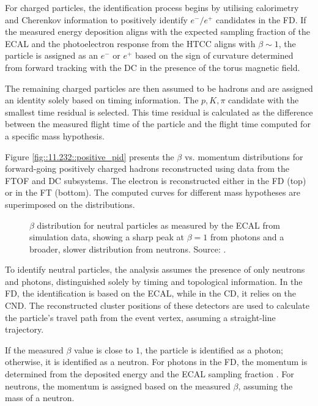     For charged particles, the identification process begins by utilising calorimetry and Cherenkov information to positively identify $e^-/e^+$ candidates in the FD.
    If the measured energy deposition aligns with the expected sampling fraction of the ECAL and the photoelectron response from the HTCC aligns with $\beta \sim 1$, the particle is assigned as an $e^-$ or $e^+$ based on the sign of curvature determined from forward tracking with the DC in the presence of the torus magnetic field.

    The remaining charged particles are then assumed to be hadrons and are assigned an identity solely based on timing information.
    The $p, K, \pi$ candidate with the smallest time residual is selected.
    This time residual is calculated as the difference between the measured flight time of the particle and the flight time computed for a specific mass hypothesis.

    Figure \ref{fig::11.232::positive_pid} presents the $\beta$ vs. momentum distributions for forward-going positively charged hadrons reconstructed using data from the FTOF and DC subsystems.
    The electron is reconstructed either in the FD (top) or in the FT (bottom).
    The computed curves for different mass hypotheses are superimposed on the distributions.

    \begin{wrapfigure}{r}{0.50\textwidth}
        \centering{}
        \caption[$\beta$ distribution of neutrals.]{$\beta$ distribution for neutral particles as measured by the ECAL from simulation data, showing a sharp peak at $\beta = 1$ from photons and a broader, slower distribution from neutrons.
        Source: \cite{ziegler2020}.
        }
        \label{fig::11.232::neutrons_and_gamma}
    \end{wrapfigure}

    To identify neutral particles, the analysis assumes the presence of only neutrons and photons, distinguished solely by timing and topological information.
    In the FD, the identification is based on the ECAL, while in the CD, it relies on the CND.
    The reconstructed cluster positions of these detectors are used to calculate the particle's travel path from the event vertex, assuming a straight-line trajectory.

    If the measured $\beta$ value is close to $1$, the particle is identified as a photon; otherwise, it is identified as a neutron.
    For photons in the FD, the momentum is determined from the deposited energy and the ECAL sampling fraction \cite{asryan2020}.
    For neutrons, the momentum is assigned based on the measured $\beta$, assuming the mass of a neutron.

